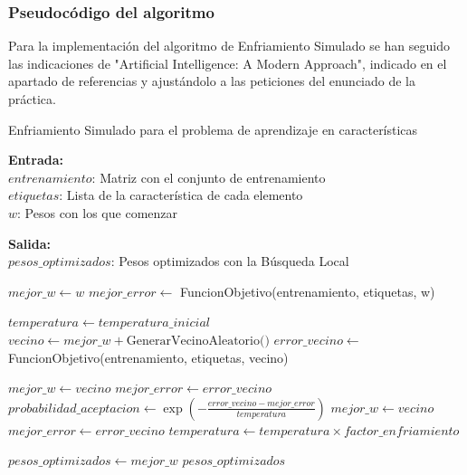 \documentclass[12pt, spanish]{article}
\begin{document}
\subsubsection{Pseudocódigo del algoritmo}
Para la implementación del algoritmo de Enfriamiento Simulado se han seguido las indicaciones de "Artificial Intelligence: A Modern Approach", indicado en el apartado de referencias y ajustándolo a las peticiones del enunciado de la práctica. 

\begin{algorithm}[h]
  \caption{Enfriamiento Simulado para el problema de aprendizaje en características}
  \label{algorithm:SA}

  \textbf{Entrada:}\\
  $entrenamiento$: Matriz con el conjunto de entrenamiento\\
  $etiquetas$: Lista de la característica de cada elemento\\
  $w$: Pesos con los que comenzar

  \textbf{Salida:}\\
  $pesos\_optimizados$: Pesos optimizados con la Búsqueda Local

  \begin{algorithmic}[1]
    \STATE $mejor\_w \gets w$
    \STATE $mejor\_error \gets$ FuncionObjetivo(entrenamiento, etiquetas, w)

    \STATE $temperatura \gets temperatura\_inicial$
        \STATE $vecino \gets mejor\_w + \text{GenerarVecinoAleatorio()}$
        \STATE $error\_vecino \gets$ FuncionObjetivo(entrenamiento, etiquetas, vecino)

          \STATE $mejor\_w \gets vecino$
          \STATE $mejor\_error \gets error\_vecino$
        \ELSE
          \STATE $probabilidad\_aceptacion \gets \exp \left( -\frac{{error\_vecino - mejor\_error}}{{temperatura}} \right)$
            \STATE $mejor\_w \gets vecino$
            \STATE $mejor\_error \gets error\_vecino$
          \ENDIF
        \ENDIF
      \ENDFOR
      \STATE $temperatura \gets temperatura \times factor\_enfriamiento$
    \ENDFOR

    \STATE $pesos\_optimizados \gets mejor\_w$
    \RETURN $pesos\_optimizados$

  \end{algorithmic}
\end{algorithm}
\end{document}
